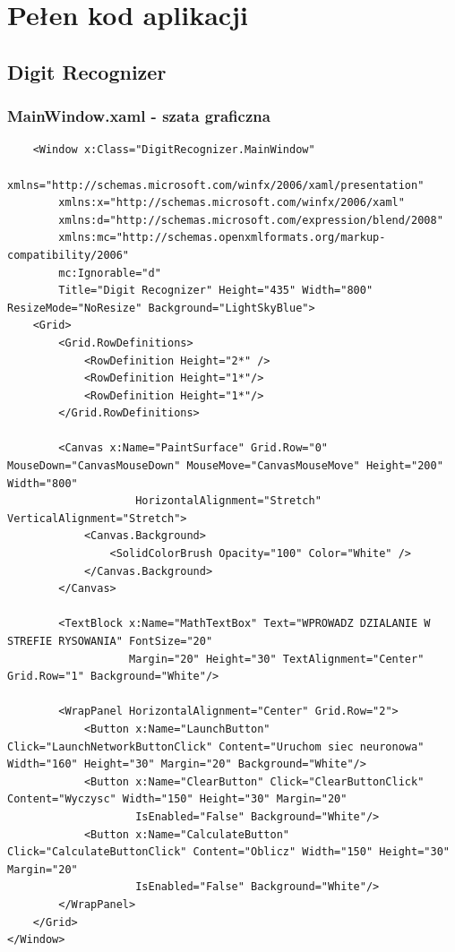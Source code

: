 \documentclass[12pt,a4paper]{article}
\begin{document}
\section*{Pełen kod aplikacji}
	\subsection*{Digit Recognizer}
	\subsubsection*{MainWindow.xaml - szata graficzna}
	\begin{lstlisting}
	<Window x:Class="DigitRecognizer.MainWindow"
        xmlns="http://schemas.microsoft.com/winfx/2006/xaml/presentation"
        xmlns:x="http://schemas.microsoft.com/winfx/2006/xaml"
        xmlns:d="http://schemas.microsoft.com/expression/blend/2008"
        xmlns:mc="http://schemas.openxmlformats.org/markup-compatibility/2006"
        mc:Ignorable="d"
        Title="Digit Recognizer" Height="435" Width="800" ResizeMode="NoResize" Background="LightSkyBlue">
    <Grid>
        <Grid.RowDefinitions>
            <RowDefinition Height="2*" />
            <RowDefinition Height="1*"/>
            <RowDefinition Height="1*"/>
        </Grid.RowDefinitions>

        <Canvas x:Name="PaintSurface" Grid.Row="0" MouseDown="CanvasMouseDown" MouseMove="CanvasMouseMove" Height="200" Width="800"
                    HorizontalAlignment="Stretch" VerticalAlignment="Stretch">
            <Canvas.Background>
                <SolidColorBrush Opacity="100" Color="White" />
            </Canvas.Background>
        </Canvas>

        <TextBlock x:Name="MathTextBox" Text="WPROWADZ DZIALANIE W STREFIE RYSOWANIA" FontSize="20" 
                   Margin="20" Height="30" TextAlignment="Center" Grid.Row="1" Background="White"/>

        <WrapPanel HorizontalAlignment="Center" Grid.Row="2">
            <Button x:Name="LaunchButton" Click="LaunchNetworkButtonClick" Content="Uruchom siec neuronowa" Width="160" Height="30" Margin="20" Background="White"/>
            <Button x:Name="ClearButton" Click="ClearButtonClick" Content="Wyczysc" Width="150" Height="30" Margin="20" 
                    IsEnabled="False" Background="White"/>
            <Button x:Name="CalculateButton" Click="CalculateButtonClick" Content="Oblicz" Width="150" Height="30" Margin="20" 
                    IsEnabled="False" Background="White"/>
        </WrapPanel>
    </Grid>
</Window>
	\end{lstlisting}
\end{document}
